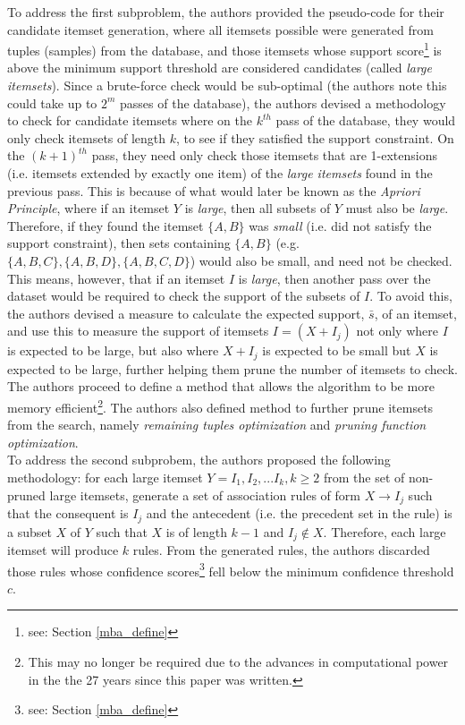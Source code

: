 \documentclass[paper=a4,fontsize=11pt]{report}	%
\begin{document}
To address the first subproblem, the authors provided the pseudo-code for their candidate itemset generation,  where all itemsets possible were generated from tuples (samples) from the database,  and those itemsets whose support score\footnote{see: Section \ref{mba_define}} is above the minimum support threshold are considered candidates (called \textit{large itemsets}).  Since a brute-force check would be sub-optimal  (the authors note this could take up to $2^m$ passes of the database),  the authors devised a methodology to check for candidate itemsets where on the $k^{th}$ pass of the database, they would only check itemsets of length $k$, to see if they satisfied the support constraint. On the $(k+1)^{th}$ pass, they need only check those itemsets that are 1-extensions (i.e.  itemsets extended by exactly one item) of the \textit{large itemsets} found in the previous pass. This is because of what would later be known as the \textit{Apriori Principle}, where if an itemset $Y$ is \textit{large}, then all subsets of $Y$ must also be \textit{large}. Therefore, if they found the itemset $\{A,B\}$ was \textit{small} (i.e. did not satisfy the support constraint), then sets containing $\{A,B\}$ (e.g. $\{A,B, C\}, \{A,B, D\}, \{A,B, C, D\}$) would also be small, and need not be checked. This means, however, that if an itemset $I$ is \textit{large}, then another pass over the dataset would be required to check the support of the subsets of $I$. To avoid this, the authors devised a measure to calculate the expected support, $\bar{s}$, of an itemset,  and use this to measure the support of itemsets $I = (X + I_j)$ not only where $I$ is expected to be large, but also where $X+I_j$ is expected to be small but $X$ is expected to be large, further helping them prune the number of itemsets to check.  The authors proceed to define a method that allows the algorithm to be more memory efficient\footnote{This may no longer be required due to the advances in computational power in the the 27 years since this paper was written.}. The authors also defined method to further prune itemsets from the search, namely \textit{remaining tuples optimization} and \textit{pruning function optimization}.\\
To address the second subprobem,  the authors proposed the following methodology: for each large itemset $Y = I_1, I_2,...I_k, k\geq 2$ from the set of non-pruned large itemsets, generate a set of association rules of form $X \rightarrow I_j$ such that the consequent is $I_j$ and the antecedent (i.e. the precedent set in the rule) is a subset $X$ of $Y$ such that $X$ is of length $k-1$ and $I_j \notin X$. Therefore, each large itemset will produce $k$ rules. From the generated rules, the authors discarded those rules whose confidence scores\footnote{see: Section \ref{mba_define}} fell below the minimum confidence threshold $c$.\\
\end{document}
